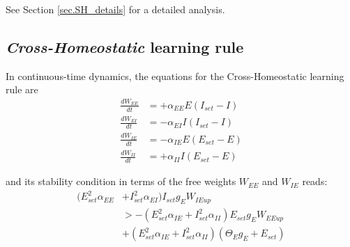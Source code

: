 \documentclass[twocolumn]{article}
\newcommand{\EE}{\mathit{EE}}
\newcommand{\EI}{\mathit{EI}}
\newcommand{\IE}{\mathit{IE}}
\newcommand{\II}{\mathit{II}}
\newcommand{\set}{\mathit{set}}
\newcommand{\up}{\mathit{up}}
\begin{document}
See Section \ref{sec.SH_details} for a detailed analysis.




\subsection{{\em Cross-Homeostatic} learning rule}

In continuous-time dynamics, the equations for the Cross-Homeostatic learning rule are
\begin{equation}
\begin{aligned}
\frac{dW_{\EE}}{dt} & = +\alpha_{\EE} E (I_{\set} - I) \\
\frac{dW_{\EI}}{dt} & = -\alpha_{\EI} I (I_{\set} - I) \\
\frac{dW_{\IE}}{dt} & = -\alpha_{\IE} E (E_{\set} - E) \\
\frac{dW_{\II}}{dt} & = +\alpha_{\II} I (E_{\set} - E)
\end{aligned}
\label{eq.CH_equation}
\end{equation}

\noindent and its stability condition in terms of the free weights $W_{\EE}$ and $W_{\IE}$ reads:
\begin{equation}
\begin{aligned}
(E_{\set}^2 \alpha_{\EE} & + I_{\set}^2 \alpha_{\EI}) I_{\set} g_E W_{\IE\up} \\
& >
-(E_{\set}^2 \alpha_{\IE} + I_{\set}^2 \alpha_{\II}) E_{\set} g_E W_{\EE\up} \\
& +
(E_{\set}^2 \alpha_{\IE} + I_{\set}^2 \alpha_{\II}) (\Theta_E g_E + E_{\set})
\end{aligned}
\label{eq.CH_stable_cond_v1}
\end{equation}
\end{document}
